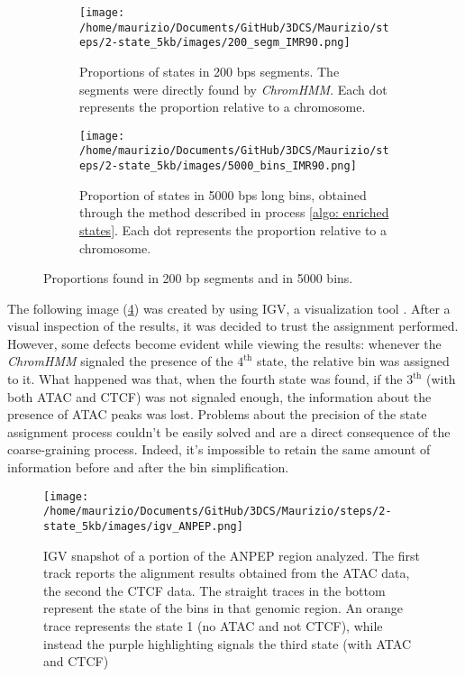 \begin{figure}[H]
  \centering
  \begin{subfigure}[t]{0.40\textwidth}
    \texttt{[image: /home/maurizio/Documents/GitHub/3DCS/Maurizio/steps/2-state\_5kb/images/200\_segm\_IMR90.png]}
    \caption{Proportions of states in 200 bps segments. The segments were directly found by \textit{ChromHMM}. Each dot represents the proportion relative to a chromosome.}
    \label{fig: proportions in segments}
  \end{subfigure}
  \begin{subfigure}[t]{0.40\textwidth}
      \texttt{[image: /home/maurizio/Documents/GitHub/3DCS/Maurizio/steps/2-state\_5kb/images/5000\_bins\_IMR90.png]}
      \caption{Proportion of states in 5000 bps long bins, obtained through the method described in process \ref{algo: enriched states}. Each dot represents the proportion relative to a chromosome.}
      \label{fig: proportions in bins}
  \end{subfigure}
  \caption{Proportions found in 200 bp segments and in 5000 bins.}
  \label{fig: proportions bins and steps}
\end{figure}


The following image (\ref{fig: ANPEP igv}) was created by using IGV, a visualization tool
\cite{robinsonIgvJsEmbeddable2020, robinsonIntegrativeGenomicsViewer2011c}. 
After a visual inspection of the results, it was decided to trust the assignment performed. However, some defects become evident while viewing the results: whenever the \textit{ChromHMM} signaled the presence of the $4^{\text{th}}$ state, the relative bin was assigned to it. What happened was that, when the fourth state was found, if the $3^{\text{th}}$ (with both ATAC and CTCF) was not signaled enough, the information about the presence of ATAC peaks was lost. Problems about the precision of the state assignment process couldn't be easily solved and are a direct consequence of the coarse-graining process.
Indeed, it's impossible to retain the same amount of information before and after the bin simplification.

\begin{figure}[H]
  \centering
  \texttt{[image: /home/maurizio/Documents/GitHub/3DCS/Maurizio/steps/2-state\_5kb/images/igv\_ANPEP.png]}
  \caption{IGV snapshot of a portion of the ANPEP region analyzed. The first track reports the alignment results obtained from the ATAC data, the second the CTCF data. The straight traces in the bottom represent the state of the bins in that genomic region. An orange trace represents the state 1 (no ATAC and not CTCF), while instead the purple highlighting signals the third state (with ATAC and CTCF)}
  \label{fig: ANPEP igv}
\end{figure}
